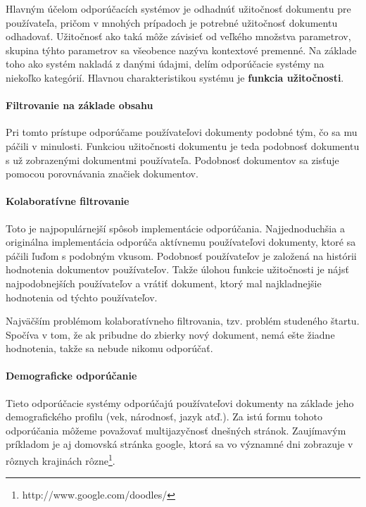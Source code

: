 Hlavným účelom odporúčacích systémov je odhadnúť užitočnosť dokumentu pre
používateľa\cite{recommender_categories}, pričom v mnohých prípadoch
je potrebné užitočnosť dokumentu odhadovať. Užitočnosť ako taká môže závisieť od
veľkého množstva parametrov, skupina týhto parametrov sa všeobence nazýva
kontextové premenné. Na základe toho ako systém nakladá z danými údajmi, 
delím odporúčacie systémy na niekoľko kategórií. Hlavnou charakteristikou systému
je \textbf{funkcia užitočnosti}.

\paragraph{Filtrovanie na základe obsahu}

Pri tomto prístupe odporúčame používateľovi dokumenty podobné tým, čo sa mu páčili
v minulosti. Funkciou užitočnosti dokumentu je teda podobnosť dokumentu s už zobrazenými
dokumentmi používateľa. Podobnosť dokumentov sa zisťuje pomocou porovnávania značiek dokumentov.

\paragraph{Kolaboratívne filtrovanie}

Toto je najpopulárnejší spôsob implementácie odporúčania. Najjednoduchšia a originálna 
implementácia odporúča aktívnemu používateľovi dokumenty, ktoré sa páčili ľuďom s podobným
vkusom. Podobnosť používateľov je založená na histórii hodnotenia dokumentov používateľov.
Takže úlohou funkcie užitočnosti je nájsť najpodobnejších používateľov a vrátiť 
dokument, ktorý mal najkladnejšie hodnotenia od týchto používateľov.

Najväčším problémom kolaboratívneho filtrovania, tzv. problém studeného štartu. Spočíva v tom,
že ak pribudne do zbierky nový dokument, nemá ešte žiadne hodnotenia, takže sa nebude nikomu
odporúčať.

\paragraph{Demograficke odporúčanie}

Tieto odporúčacie systémy odporúčajú používateľovi dokumenty na základe jeho demografického
profilu (vek, národnosť, jazyk atď.). Za istú formu tohoto odporúčania môžeme považovať
multijazyčnosť dnešných stránok. Zaujímavým príkladom je aj domovská stránka google,
ktorá sa vo významné dni zobrazuje v rôznych krajinách
rôzne\footnote{http://www.google.com/doodles/}.

